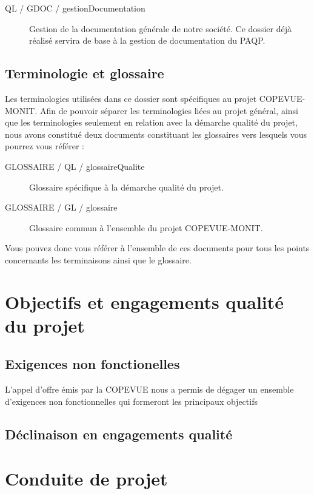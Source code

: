 \documentclass{mise_en_page}
\begin{document}
\begin{description}
	\item[QL / GDOC / gestionDocumentation] Gestion de la documentation générale de notre société. Ce dossier déjà réalisé servira de base à la gestion de documentation du PAQP.
\end{description}

\subsection{Terminologie et glossaire}

Les terminologies utilisées dans ce dossier sont spécifiques au projet COPEVUE-MONIT. Afin de pouvoir séparer les terminologies liées au projet général, ainsi que les terminologies seulement en relation avec la démarche qualité du projet, nous avons constitué deux documents constituant les glossaires vers lesquels vous pourrez vous référer :

\begin{description}
	\item[GLOSSAIRE / QL / glossaireQualite ] Glossaire spécifique à la démarche qualité du projet.
	\item[GLOSSAIRE / GL / glossaire ] Glossaire commun à l'ensemble du projet COPEVUE-MONIT.
\end{description}

Vous pouvez donc vous référer à l'ensemble de ces documents pour tous les points concernants les terminaisons ainsi que le glossaire.

\section{Objectifs et engagements qualité du projet}

\subsection{Exigences non fonctionelles}

L'appel d'offre émis par la COPEVUE nous a permis de dégager un ensemble d'exigences non fonctionnelles qui formeront les principaux objectifs 

\subsection{Déclinaison en engagements qualité}

\section{Conduite de projet}
\end{document}
